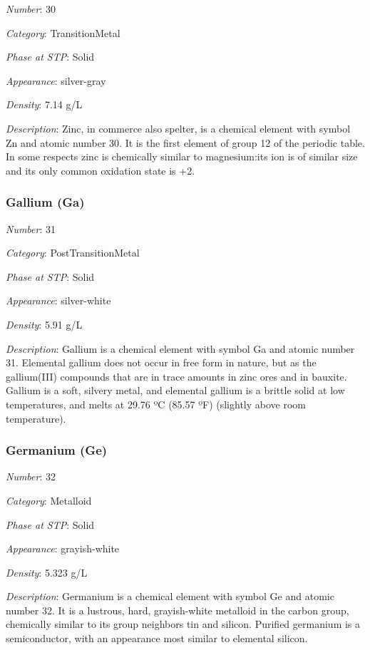 \documentclass{article}
\begin{document}
\textit{Number}: 30

\textit{Category}: TransitionMetal

\textit{Phase at STP}: Solid

\textit{Appearance}: silver-gray

\textit{Density}: 7.14 g/L

\textit{Description}: Zinc, in commerce also spelter, is a chemical element with symbol Zn and atomic number 30. It is the first element of group 12 of the periodic table. In some respects zinc is chemically similar to magnesium:its ion is of similar size and its only common oxidation state is +2.

\hypertarget{subsubsection::Ga}{}\subsubsection{Gallium (Ga)}

\textit{Number}: 31

\textit{Category}: PostTransitionMetal

\textit{Phase at STP}: Solid

\textit{Appearance}: silver-white

\textit{Density}: 5.91 g/L

\textit{Description}: Gallium is a chemical element with symbol Ga and atomic number 31. Elemental gallium does not occur in free form in nature, but as the gallium(III) compounds that are in trace amounts in zinc ores and in bauxite. Gallium is a soft, silvery metal, and elemental gallium is a brittle solid at low temperatures, and melts at 29.76 ºC (85.57 ºF) (slightly above room temperature).

\hypertarget{subsubsection::Ge}{}\subsubsection{Germanium (Ge)}

\textit{Number}: 32

\textit{Category}: Metalloid

\textit{Phase at STP}: Solid

\textit{Appearance}: grayish-white

\textit{Density}: 5.323 g/L

\textit{Description}: Germanium is a chemical element with symbol Ge and atomic number 32. It is a lustrous, hard, grayish-white metalloid in the carbon group, chemically similar to its group neighbors tin and silicon. Purified germanium is a semiconductor, with an appearance most similar to elemental silicon.
\end{document}
